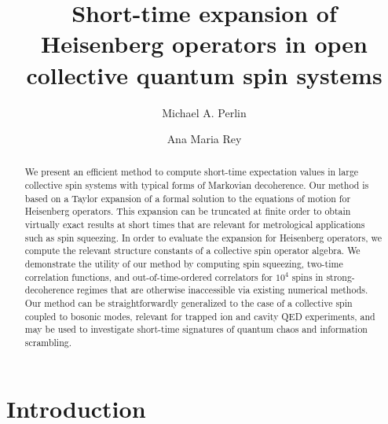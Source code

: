 \documentclass[aps,pra,twocolumn,longbibliography]{revtex4-2}
\newcommand{\1}{\mathds{1}}
\begin{document}
\title{Short-time expansion of Heisenberg operators in open collective
  quantum spin systems}

\author{Michael A. Perlin}
\author{Ana Maria Rey}

\begin{abstract}
  We present an efficient method to compute short-time expectation
  values in large collective spin systems with typical forms of
  Markovian decoherence.  Our method is based on a Taylor expansion of
  a formal solution to the equations of motion for Heisenberg
  operators.  This expansion can be truncated at finite order to
  obtain virtually exact results at short times that are relevant for
  metrological applications such as spin squeezing.  In order to
  evaluate the expansion for Heisenberg operators, we compute the
  relevant structure constants of a collective spin operator algebra.
  We demonstrate the utility of our method by computing spin
  squeezing, two-time correlation functions, and out-of-time-ordered
  correlators for $10^4$ spins in strong-decoherence regimes that are
  otherwise inaccessible via existing numerical methods.  Our method
  can be straightforwardly generalized to the case of a collective
  spin coupled to bosonic modes, relevant for trapped ion and cavity
  QED experiments, and may be used to investigate short-time
  signatures of quantum chaos and information scrambling.
\end{abstract}

\maketitle

\section{Introduction}
\end{document}
